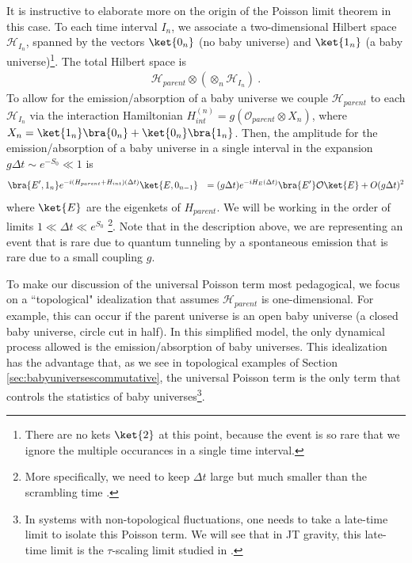 \documentclass[a4paper,11pt]{article}
\theoremstyle{definition}
\numberwithin{equation}{section}
\newcommand{\mH}{\mathcal{H}}
\newcommand{\mO}{\mathcal{O}}
\newcommand{\lb}{\left(}
\newcommand{\rb}{\right)}
\begin{document}
It is instructive to elaborate more on the origin of the Poisson limit theorem in this case. To each time interval $I_n$, we associate a two-dimensional Hilbert space $\mH_{I_n}$, spanned by the vectors $\ket{0_n}$ (no baby universe) and $\ket{1_n}$ (a baby universe)\footnote{There are no kets $\ket{2}$ at this point, because the event is so rare that we ignore the multiple occurances in a single time interval.}. The total Hilbert space is 
\begin{eqnarray}
    \mH_{parent}\otimes \lb\otimes_n \mH_{I_n}\rb\ .
\end{eqnarray}
To allow for the emission/absorption of a baby universe we couple $\mH_{parent}$ to each $\mH_{I_n}$ via the interaction Hamiltonian $H^{(n)}_{int}=g(\mO_{parent}\otimes X_n)$, where $X_n=\ket{1_n}\bra{0_n}+\ket{0_n}\bra{1_n}$. Then, the amplitude for the emission/absorption of a baby universe in a single interval in the expansion $g\Delta t \sim e^{-S_0}\ll 1$ is  
\begin{eqnarray}\label{transitionamp}
    \bra{E',1_n}e^{-i(H_{parent}+H_{int})(\Delta t)}\ket{E,0_{n-1}}&&=(g\Delta t)e^{-iH_E(\Delta t)}\bra{E'}\mO\ket{E}+O(g\Delta t)^2
\end{eqnarray}
where $\ket{E}$ are the eigenkets of $H_{parent}$. We will be working in the order of limits $1\ll \Delta t\ll e^{S_0}$ \footnote{More specifically, we need to keep $\Delta t$ large but much smaller than the scrambling time \cite{chandrasekaran2023large}.}. Note that in the description above, we are representing an event that is rare due to quantum tunneling by a spontaneous emission that is rare due to a small coupling $g$. 

To make our discussion of the universal Poisson term most pedagogical, we focus on a ``topological" idealization that assumes $\mH_{parent}$ is one-dimensional. For example, this can occur if the parent universe is an open baby universe (a closed baby universe, circle cut in half). In this simplified model, the only dynamical process allowed is the emission/absorption of baby universes. This idealization has the advantage that, as we see in topological examples of Section \ref{sec:babyuniversescommutative}, the universal Poisson term is the only term that controls the statistics of baby universes\footnote{In systems with non-topological fluctuations, one needs to take a late-time limit to isolate this Poisson term. We will see that in JT gravity, this late-time limit is the $\tau$-scaling limit studied in \cite{okuyama2020multi,blommaert2023integrable,saad2024convergent}.}.
\end{document}
